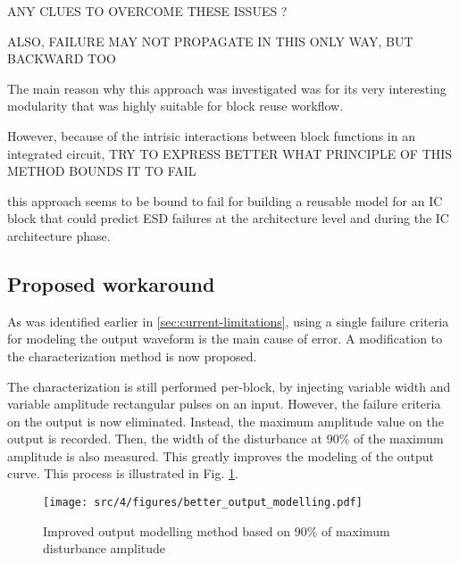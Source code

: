 ANY CLUES TO OVERCOME THESE ISSUES ?

ALSO, FAILURE MAY NOT PROPAGATE IN THIS ONLY WAY, BUT BACKWARD TOO

The main reason why this approach was investigated was for its very interesting modularity
that was highly suitable for block reuse workflow.

However, because of the intrisic interactions between block functions in an integrated circuit,
TRY TO EXPRESS BETTER WHAT PRINCIPLE OF THIS METHOD BOUNDS IT TO FAIL

this approach seems to be bound to fail for building a reusable model for an IC block that could predict
ESD failures at the architecture level and during the IC architecture phase.

\subsection{Proposed workaround}
As was identified earlier in \ref{sec:current-limitations}, using a single failure criteria for modeling the output waveform is the main cause of error.
A modification to the characterization method is now proposed.

The characterization is still performed per-block, by injecting variable width and variable amplitude rectangular pulses on an input.
However, the failure criteria on the output is now eliminated.
Instead, the maximum amplitude value on the output is recorded.
Then, the width of the disturbance at 90\% of the maximum amplitude is also measured.
This greatly improves the modeling of the output curve.
This process is illustrated in Fig. \ref{fig:impact-single-failure-criteria}.

\begin{figure}[!htbp]
  \centering
  \texttt{[image: src/4/figures/better\_output\_modelling.pdf]}
  \caption{Improved output modelling method based on 90\% of maximum disturbance amplitude}
  \label{fig:impact-single-failure-criteria}
\end{figure}

